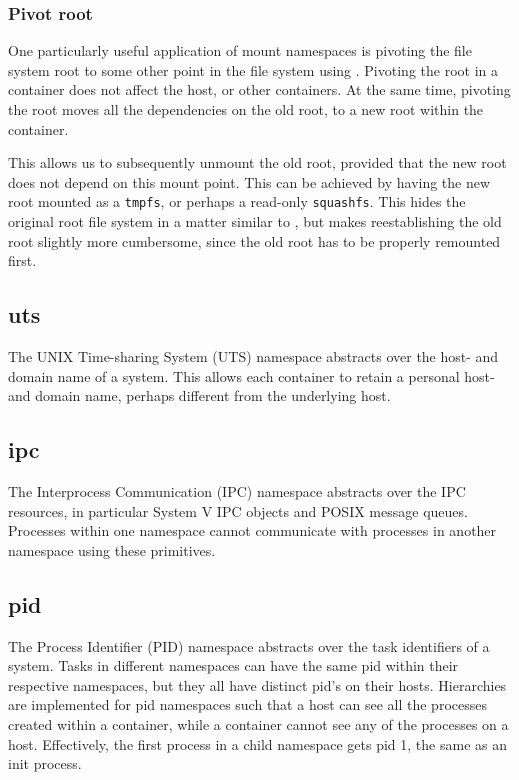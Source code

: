 \subsubsection{Pivot root}

One particularly useful application of mount namespaces is pivoting the file
system root to some other point in the file system using
\cite{man-2-pivot-root}. Pivoting the root in a container does not affect the
host, or other containers. At the same time, pivoting the root moves all the
dependencies on the old root, to a new root within the container.

This allows us to subsequently unmount the old root, provided that the new root
does not depend on this mount point. This can be achieved by having the new
root mounted as a \texttt{tmpfs}, or perhaps a read-only \texttt{squashfs}.
This hides the original root file system in a matter similar to
\cite{man-2-chroot}, but makes reestablishing the old root slightly more
cumbersome, since the old root has to be properly remounted first.

\subsection{uts}

The UNIX Time-sharing System (UTS) namespace abstracts over the host- and domain
name of a system. This allows each container to retain a personal host- and
domain name, perhaps different from the underlying host.

\subsection{ipc}

The Interprocess Communication (IPC) namespace abstracts over the IPC
resources, in particular System V IPC objects and POSIX message queues.
Processes within one namespace cannot communicate with processes in another
namespace using these primitives.

\subsection{pid}

The Process Identifier (PID) namespace abstracts over the task identifiers of a
system. Tasks in different namespaces can have the same pid within their
respective namespaces, but they all have distinct pid's on their hosts.
Hierarchies are implemented for pid namespaces such that a host can see all the
processes created within a container, while a container cannot see any of the
processes on a host. Effectively, the first process in a child namespace gets
pid 1, the same as an init process.

